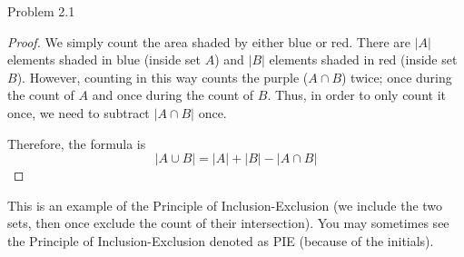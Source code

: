 \begin{sol}{Problem 2.1}
\begin{proof}
We simply count the area shaded by either blue or red. There are $|A|$ elements shaded in blue (inside set $A$) and $|B|$ elements shaded in red (inside set $B$). However, counting in this way counts the purple ($A \cap B$) twice; once during the count of $A$ and once during the count of $B$. Thus, in order to only count it once, we need to subtract $|A \cap B|$ once. 

Therefore, the formula is 
\[
|A \cup B| = |A| +  |B| - |A \cap B|
\]
\end{proof}

This is an example of the Principle of Inclusion-Exclusion (we include the two sets, then once exclude the count of their intersection). You may sometimes see the Principle of Inclusion-Exclusion denoted as PIE (because of the initials).
\end{sol}

